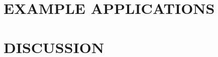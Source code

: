 \documentclass{sigchi}
\begin{document}
\section{EXAMPLE APPLICATIONS}


\section{DISCUSSION}



\end{document}
